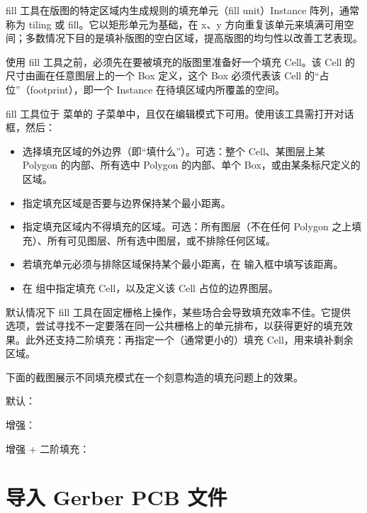 fill 工具在版图的特定区域内生成规则的填充单元（fill unit）Instance 阵列，通常称为 tiling 或 fill。它以矩形单元为基础，在 x、y 方向重复该单元来填满可用空间；多数情况下目的是填补版图的空白区域，提高版图的均匀性以改善工艺表现。

使用 fill 工具之前，必须先在要被填充的版图里准备好一个填充 Cell。该 Cell 的尺寸由画在任意图层上的一个 Box 定义，这个 Box 必须代表该 Cell 的“占位”（footprint），即一个 Instance 在待填区域内所覆盖的空间。

fill 工具位于  菜单的  子菜单中，且仅在编辑模式下可用。使用该工具需打开对话框，然后：

\begin{itemize}
\item 选择填充区域的外边界（即“填什么”）。可选：整个 Cell、某图层上某 Polygon 的内部、所有选中 Polygon 的内部、单个 Box，或由某条标尺定义的区域。
\item 指定填充区域是否要与边界保持某个最小距离。
\item 指定填充区域内不得填充的区域。可选：所有图层（不在任何 Polygon 之上填充）、所有可见图层、所有选中图层，或不排除任何区域。
\item 若填充单元必须与排除区域保持某个最小距离，在  输入框中填写该距离。
\item 在  组中指定填充 Cell，以及定义该 Cell 占位的边界图层。
\end{itemize}

默认情况下 fill 工具在固定栅格上操作，某些场合会导致填充效率不佳。它提供  选项，尝试寻找不一定要落在同一公共栅格上的单元排布，以获得更好的填充效果。此外还支持二阶填充：再指定一个（通常更小的）填充 Cell，用来填补剩余区域。

下面的截图展示不同填充模式在一个刻意构造的填充问题上的效果。

\begin{kldesc}
\item 默认：
\end{kldesc}

\begin{kldesc}
\item 增强：
\end{kldesc}

\begin{kldesc}
\item 增强 + 二阶填充：
\end{kldesc}

\section{导入 Gerber PCB 文件}\label{sec:import_gerber}


